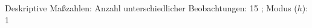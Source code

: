 				\label{tableValues:bsch19b_g2}
				\vspace*{-\baselineskip}
                    \begin{noten}
                	    \note{} Deskriptive Maßzahlen:
                	    Anzahl unterschiedlicher Beobachtungen: 15%
                	    ; 
                	      Modus ($h$): 1
                     \end{noten}

